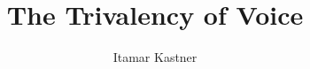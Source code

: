 \author{Itamar Kastner} %
\title{The Trivalency of Voice}  

\renewcommand{\lsSeries}{ogs} %
\renewcommand{\lsSeriesNumber}{99} %



\renewcommand{\lsISBNdigital}{000-0-000000-00-0}
\renewcommand{\lsISBNhardcover}{000-0-000000-00-0} 
